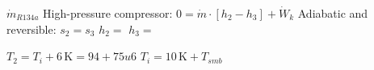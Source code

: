 \( \dot{m}_{R134a} \)  
High-pressure compressor:  
\( 0 = \dot{m} \cdot [h_2 - h_3] + \dot{W}_k \)  
Adiabatic and reversible: \( s_2 = s_3 \)  
\( h_2 = \)  
\( h_3 = \)  

\( T_2 = T_i + 6 \, \text{K} = 94 + 75u6 \)  
\( T_i = 10 \, \text{K} + T_{smb} \)